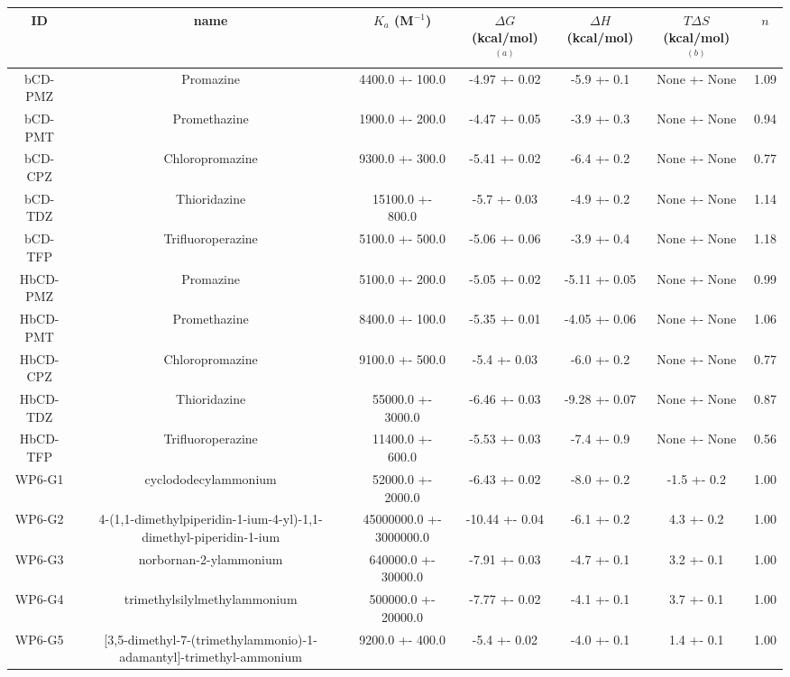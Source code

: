 \documentclass{article}
\begin{document}
\begin{center}
\footnotesize
\begin{tabu}{| c | c | c | c | c | c | c |}
\hline
\rowfont{\bfseries} ID & name & $K_a$ (M$^{-1}$) & $\Delta G$ (kcal/mol) $^{(a)}$ & $\Delta H$ (kcal/mol) & $T\Delta S$ (kcal/mol) $^{(b)}$ & $n$ \\
\hline
\hline
bCD-PMZ & Promazine & 4400.0 +- 100.0 & -4.97 +- 0.02 & -5.9 +- 0.1 & None +- None &  1.09 \\
\hline
bCD-PMT & Promethazine & 1900.0 +- 200.0 & -4.47 +- 0.05 & -3.9 +- 0.3 & None +- None &  0.94 \\
\hline
bCD-CPZ & Chloropromazine & 9300.0 +- 300.0 & -5.41 +- 0.02 & -6.4 +- 0.2 & None +- None &  0.77 \\
\hline
bCD-TDZ & Thioridazine & 15100.0 +- 800.0 & -5.7 +- 0.03 & -4.9 +- 0.2 & None +- None &  1.14 \\
\hline
bCD-TFP & Trifluoroperazine & 5100.0 +- 500.0 & -5.06 +- 0.06 & -3.9 +- 0.4 & None +- None &  1.18 \\
\hline
\hline
HbCD-PMZ & Promazine & 5100.0 +- 200.0 & -5.05 +- 0.02 & -5.11 +- 0.05 & None +- None &  0.99 \\
\hline
HbCD-PMT & Promethazine & 8400.0 +- 100.0 & -5.35 +- 0.01 & -4.05 +- 0.06 & None +- None &  1.06 \\
\hline
HbCD-CPZ & Chloropromazine & 9100.0 +- 500.0 & -5.4 +- 0.03 & -6.0 +- 0.2 & None +- None &  0.77 \\
\hline
HbCD-TDZ & Thioridazine & 55000.0 +- 3000.0 & -6.46 +- 0.03 & -9.28 +- 0.07 & None +- None &  0.87 \\
\hline
HbCD-TFP & Trifluoroperazine & 11400.0 +- 600.0 & -5.53 +- 0.03 & -7.4 +- 0.9 & None +- None &  0.56 \\
\hline
\hline
WP6-G1 & cyclododecylammonium & 52000.0 +- 2000.0 & -6.43 +- 0.02 & -8.0 +- 0.2 & -1.5 +- 0.2 &  1.00 \\
\hline
WP6-G2 & 4-(1,1-dimethylpiperidin-1-ium-4-yl)-1,1-dimethyl-piperidin-1-ium & 45000000.0 +- 3000000.0 & -10.44 +- 0.04 & -6.1 +- 0.2 & 4.3 +- 0.2 &  1.00 \\
\hline
WP6-G3 & norbornan-2-ylammonium & 640000.0 +- 30000.0 & -7.91 +- 0.03 & -4.7 +- 0.1 & 3.2 +- 0.1 &  1.00 \\
\hline
WP6-G4 & trimethylsilylmethylammonium & 500000.0 +- 20000.0 & -7.77 +- 0.02 & -4.1 +- 0.1 & 3.7 +- 0.1 &  1.00 \\
\hline
WP6-G5 & [3,5-dimethyl-7-(trimethylammonio)-1-adamantyl]-trimethyl-ammonium & 9200.0 +- 400.0 & -5.4 +- 0.02 & -4.0 +- 0.1 & 1.4 +- 0.1 &  1.00 \\

\end{tabu}
\end{center}
\end{document}
